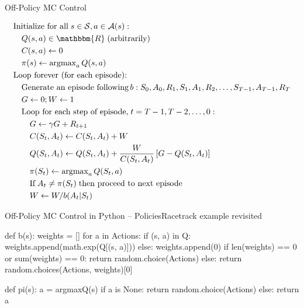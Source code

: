 \documentclass[ignorenonframetext,xcolor=x11names]{beamer}
\begin{document}
 

\begin{frame}[label=full]{Off-Policy MC Control}
\begin{block}{}
\footnotesize
\begin{align*}
& \text{Initialize for all}\; s \in \mathcal{S}, a \in \mathcal{A}(s):\\
& \quad Q(s,a) \in \mathbbm{R}\; \text{(arbitrarily)} \\
& \quad C(s, a) \leftarrow 0 \\
& \quad \pi(s) \leftarrow \operatorname{arg max}_a Q(s, a) \\
& \text{Loop forever (for each episode):} \\
& \quad \text{Generate an episode following}\, b: S_0, A_0, R_1, S_1, A_1, R_2, \ldots, S_{T-1}, A_{T-1}, R_{T} \\
& \quad G \leftarrow 0; W \leftarrow 1 \\
& \quad \text{Loop for each step of episode,}\; t = T-1, T-2, \ldots, 0: \\
& \quad \quad G \leftarrow \gamma G + R_{t+1} \\
& \quad \quad C(S_t, A_t) \leftarrow C(S_t, A_t) + W \\
& \quad \quad Q(S_t, A_t) \leftarrow Q(S_t, A_t) + \frac{W}{C(S_t, A_t)} \left[ G - Q(S_t, A_t) \right] \\
& \quad \quad \pi(S_t) \leftarrow \operatorname{arg max}_a Q(S_t, a) \\
& \quad \quad \text{If}\; A_t \neq \pi(S_t) \; \text{then proceed to next episode} \\
& \quad \quad W \leftarrow W / b(A_t | S_t)
\end{align*}
\end{block}
\end{frame}

\begin{frame}[label=withcode,fragile]{Off-Policy MC Control in Python -- Policies}{Racetrack example revisited}
\begin{pythoncode}
def b(s):
    weights = []
    for a in Actions:
        if (s, a) in Q:
            weights.append(math.exp(Q[(s, a)]))
        else:
            weights.append(0)
    if len(weights) == 0 or sum(weights) == 0:
        return random.choice(Actions)
    else:
        return random.choices(Actions, weights)[0]

def pi(s):
    a = argmaxQ(s)
    if a is None:
        return random.choice(Actions)
    else:
        return a
\end{pythoncode}
\end{frame}
\end{document}
